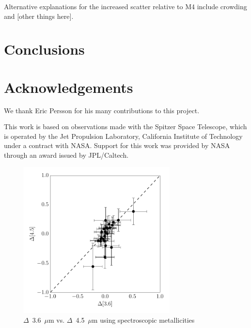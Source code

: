 \documentclass[a4paper,fleqn,usenatbib]{mnras}
\begin{document}
Alternative explanations for the increased scatter relative to M4 include crowding and [other things here].


\section{Conclusions}
\label{sec:conclusions}


\section*{Acknowledgements}
\label{sec:acknowledgements}

We thank Eric Persson for his many contributions to this project.

This work is based on observations made with the Spitzer Space Telescope, which is operated by the Jet Propulsion Laboratory, California Institute of Technology under a contract with NASA. Support for this work was provided by NASA through an award issued by JPL/Caltech.













\begin{figure}
\begin{center}
\includegraphics[width=80mm]{final_plots/deltadelta_3p6_4p5_spect.pdf}
\caption{$\Delta$~3.6~$\mu$m vs. $\Delta$~4.5~$\mu$m using spectroscopic metallicities}
\label{fig:deltadelta_spect}
\end{center}
\end{figure}
\end{document}
